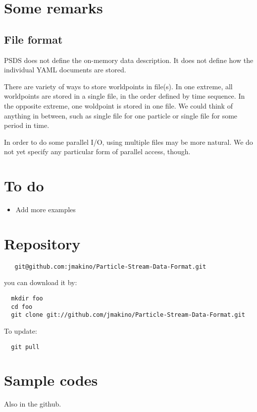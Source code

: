 \documentclass[12pt]{article}
\begin{document}
\section{Some remarks}

\subsection{File format}
PSDS does not define the on-memory data description. It does not
define how the individual YAML documents are stored.

There are variety of ways to store worldpoints in file(s). In one
extreme, all worldpoints are stored in a single file, in the order
defined by time sequence. In the opposite extreme, one woldpoint is
stored in one file. We could think of anything in between, such as
single file for one particle or single file for some period in time.

In order to do some parallel I/O, using multiple files may be more
natural. We do not yet specify any particular form of parallel access,
though. 

\section{To do}

\begin{itemize}
\item Add more examples
\end{itemize}  


\appendix

\section{Repository}


\begin{verbatim}
   git@github.com:jmakino/Particle-Stream-Data-Format.git
\end{verbatim}

you can download it by:
\begin{verbatim}
  mkdir foo
  cd foo
  git clone git://github.com/jmakino/Particle-Stream-Data-Format.git
\end{verbatim}

To update:

\begin{verbatim}
  git pull
\end{verbatim}
  
\section{Sample codes}
Also in the github.
\end{document}
